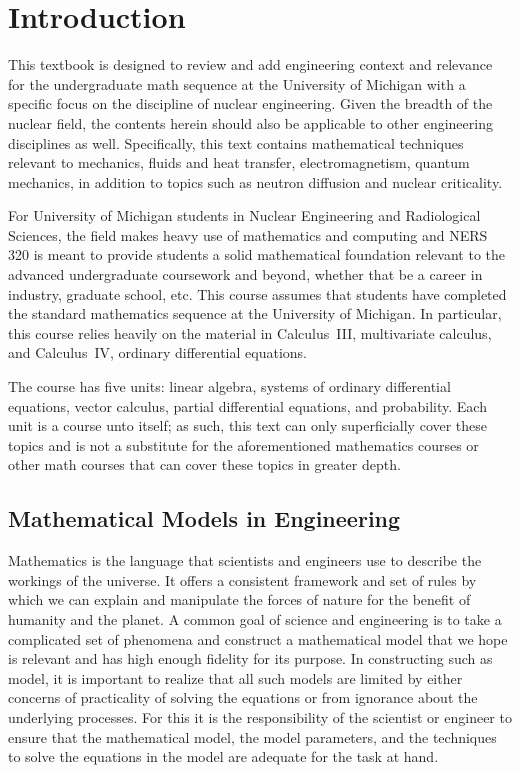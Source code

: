 \tableofcontents

\clearpage
{}
\setcounter{page}{1}
\chapter{Introduction}

This textbook is designed to review and add engineering context and relevance for the undergraduate math sequence at the University of Michigan with a specific focus on the discipline of nuclear engineering. Given the breadth of the nuclear field, the contents herein should also be applicable to other engineering disciplines as well. Specifically, this text contains mathematical techniques relevant to mechanics, fluids and heat transfer, electromagnetism, quantum mechanics, in addition to topics such as neutron diffusion and nuclear criticality.

For University of Michigan students in Nuclear Engineering and Radiological Sciences, the field makes heavy use of mathematics and computing and NERS 320 is meant to provide students a solid mathematical foundation relevant to the advanced undergraduate coursework and beyond, whether that be a career in industry, graduate school, etc. This course assumes that students have completed the standard mathematics sequence at the University of Michigan. In particular, this course relies heavily on the material in Calculus~III, multivariate calculus, and Calculus~IV, ordinary differential equations. 

The course has five units: linear algebra, systems of ordinary differential equations, vector calculus, partial differential equations, and probability. Each unit is a course unto itself; as such, this text can only superficially cover these topics and is not a substitute for the aforementioned mathematics courses or other math courses that can cover these topics in greater depth. 

\section{Mathematical Models in Engineering}

Mathematics is the language that scientists and engineers use to describe the workings of the universe. It offers a consistent framework and set of rules by which we can explain and manipulate the forces of nature for the benefit of humanity and the planet. A common goal of science and engineering is to take a complicated set of phenomena and construct a mathematical model that we hope is relevant and has high enough fidelity for its purpose. In constructing such as model, it is important to realize that all such models are limited by either concerns of practicality of solving the equations or from ignorance about the underlying processes. For this it is the responsibility of the scientist or engineer to ensure that the mathematical model, the model parameters, and the techniques to solve the equations in the model are adequate for the task at hand.

